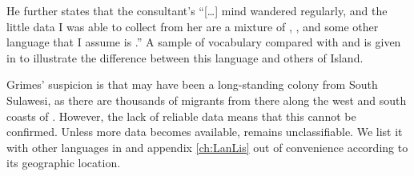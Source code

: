 He further states that the consultant's ``[\ldots] mind wandered
regularly, and the little data I was able to collect from her are a mixture of ,
, and some other language that I assume is .'' \citep[75]{Grimes2010}
A sample of  vocabulary compared with  and  is given in 
to illustrate the difference between this language and others of  Island.

Grimes' suspicion is that  may have been a long-standing colony from
South Sulawesi, as there are thousands of migrants from there along the
west and south coasts of . However, the lack of reliable data means
that this cannot be confirmed. Unless more data becomes available,
 remains unclassifiable. We list it with other  languages
in  and appendix \ref{ch:LanLis} out of convenience according to its geographic location.
